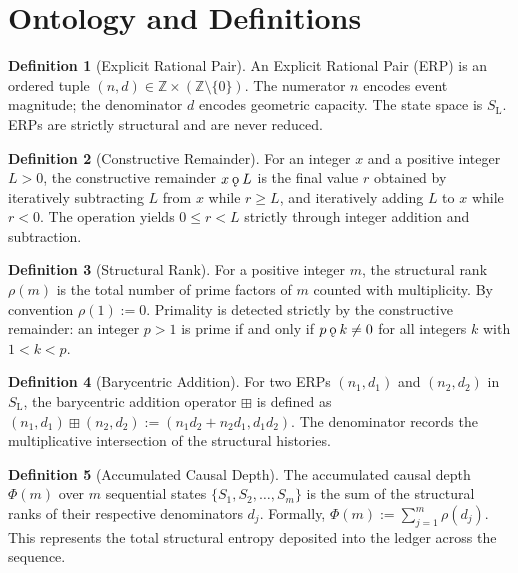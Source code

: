 \documentclass[11pt, letterpaper]{article}
\newcommand{\Z}{\mathbb{Z}}
\newcommand{\SL}{S_{\mathrm{L}}}
\newcommand{\rank}{\rho}
\newcommand{\koppa}{\mathbin{\text{\rm\k{o}}}}
\newcommand{\bplus}{\boxplus}
\theoremstyle{definition}
\newtheorem{definition}{Definition}[section]
\begin{document}
\section{Ontology and Definitions}

\begin{rsbox}
\begin{definition}[Explicit Rational Pair]
An Explicit Rational Pair (ERP) is an ordered tuple $(n, d) \in \Z \times (\Z \setminus \{0\})$. The numerator $n$ encodes event magnitude; the denominator $d$ encodes geometric capacity. The state space is $\SL$. ERPs are strictly structural and are never reduced.
\end{definition}
\end{rsbox}

\begin{rsbox}
\begin{definition}[Constructive Remainder]
For an integer $x$ and a positive integer $L > 0$, the constructive remainder $x \koppa L$ is the final value $r$ obtained by iteratively subtracting $L$ from $x$ while $r \ge L$, and iteratively adding $L$ to $x$ while $r < 0$. The operation yields $0 \le r < L$ strictly through integer addition and subtraction.
\end{definition}
\end{rsbox}

\begin{rsbox}
\begin{definition}[Structural Rank]
For a positive integer $m$, the structural rank $\rank(m)$ is the total number of prime factors of $m$ counted with multiplicity. By convention $\rank(1) := 0$. Primality is detected strictly by the constructive remainder: an integer $p > 1$ is prime if and only if $p \koppa k \neq 0$ for all integers $k$ with $1 < k < p$.
\end{definition}
\end{rsbox}

\begin{rsbox}
\begin{definition}[Barycentric Addition]
For two ERPs $(n_1, d_1)$ and $(n_2, d_2)$ in $\SL$, the barycentric addition operator $\bplus$ is defined as $(n_1, d_1) \bplus (n_2, d_2) := (n_1 d_2 + n_2 d_1, d_1 d_2)$. The denominator records the multiplicative intersection of the structural histories.
\end{definition}
\end{rsbox}

\begin{rsbox}
\begin{definition}[Accumulated Causal Depth]
The accumulated causal depth $\Phi(m)$ over $m$ sequential states $\{S_1, S_2, \dots, S_m\}$ is the sum of the structural ranks of their respective denominators $d_j$. Formally, $\Phi(m) := \sum_{j=1}^{m} \rank(d_j)$. This represents the total structural entropy deposited into the ledger across the sequence.
\end{definition}
\end{rsbox}
\end{document}
